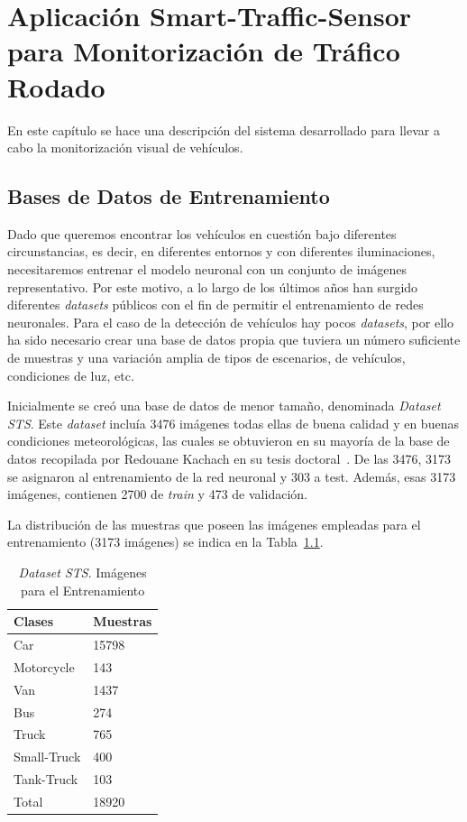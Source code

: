 \chapter{Aplicación Smart-Traffic-Sensor para Monitorización de Tráfico Rodado}\label{cap.diseno}

En este capítulo se hace una descripción del sistema desarrollado para llevar a cabo la monitorización visual de vehículos.

\section{Bases de Datos de Entrenamiento}\label{sec.base_datos}

Dado que queremos encontrar los vehículos en cuestión bajo diferentes circunstancias, es decir, en diferentes entornos y con diferentes iluminaciones, necesitaremos entrenar el modelo neuronal con un conjunto de imágenes representativo. Por este motivo, a lo largo de los últimos años han surgido diferentes \textit{datasets} públicos con el fin de permitir el entrenamiento de redes neuronales. Para el caso de la detección de vehículos hay pocos \textit{datasets}, por ello ha sido necesario crear una base de datos propia que tuviera un número suficiente de muestras y una variación amplia de tipos de escenarios, de vehículos, condiciones de luz, etc.

Inicialmente se creó una base de datos de menor tamaño, denominada \textit{Dataset STS}. Este \textit{dataset} incluía 3476 imágenes todas ellas de buena calidad y en buenas condiciones meteorológicas, las cuales se obtuvieron en su mayoría de la base de datos recopilada por Redouane Kachach en su tesis doctoral~\cite{traffic_monitor_lab}. De las 3476, 3173 se asignaron al entrenamiento de la red neuronal y 303 a test. Además, esas 3173 imágenes, contienen 2700 de \textit{train} y 473 de validación.

La distribución de las muestras que poseen las imágenes empleadas para el entrenamiento (3173 imágenes) se indica en la Tabla~\ref{tabla_database}.

\begin{table}[H]
\begin{center}
\begin{tabular}{|l|l|}
\hline
Clases & Muestras \\
\hline \hline
Car & 15798 \\ \hline
Motorcycle & 143 \\ \hline
Van & 1437 \\ \hline
Bus & 274 \\ \hline
Truck & 765 \\ \hline
Small-Truck & 400 \\ \hline
Tank-Truck & 103 \\ \hline
Total & 18920 \\ \hline
\end{tabular}
\caption{\textit{Dataset STS}. Imágenes para el Entrenamiento}
\label{tabla_database}
\end{center}
\end{table}


